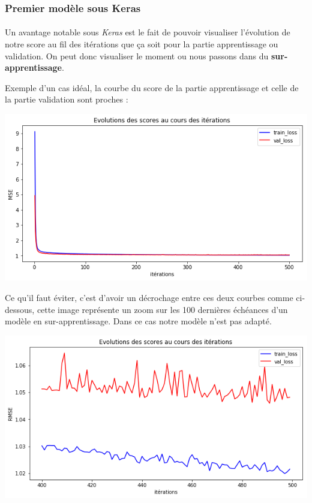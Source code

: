 \documentclass[14pt, openany]{article}
\begin{document}
\subsubsection{Premier modèle sous Keras}
\paragraph{}
Un avantage notable sous \textit{Keras} est le fait de pouvoir visualiser l'évolution de notre score au fil des itérations que ça soit pour la partie apprentissage ou validation. On peut donc visualiser le moment ou nous passons dans du \textbf{sur-apprentissage}.

Exemple d'un cas idéal, la courbe du score de la partie apprentissage et celle de la partie validation sont proches :

\begin{center}
\includegraphics[scale=0.7]{Images/evo_score2.png}
\end{center}

Ce qu'il faut éviter, c'est d'avoir un décrochage entre ces deux courbes comme ci-dessous, cette image représente un zoom sur les 100 dernières échéances d'un modèle en sur-apprentissage. Dans ce cas notre modèle n'est pas adapté.

\begin{center}
\includegraphics[scale=0.7]{Images/evo_score3.png}
\end{center}
\end{document}
